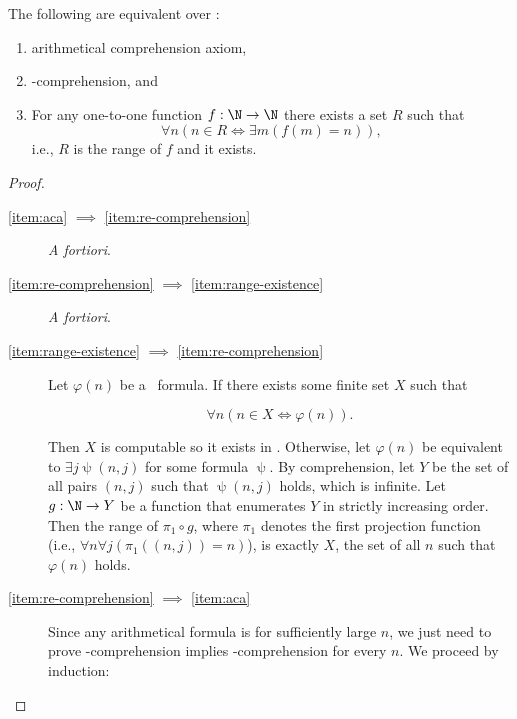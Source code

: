 \documentclass[../main.tex]{memoir}
\begin{document}
\begin{lemma}
  \label{lemma:aca-equivalences}
  The following are equivalent over \rca:

  \begin{enumerate}[label=(\roman*), ref=(\roman*)]
  \item \label{item:aca} arithmetical comprehension axiom,
  \item \label{item:re-comprehension} \re-comprehension, and
  \item \label{item:range-existence} For any one-to-one function $f: \N \to \N$ there exists a set $R$ such that
    \[ \forall n (n \in R \iff \exists m (f(m) = n)), \]
    i.e., $R$ is the range of $f$ and it exists.
  \end{enumerate}
\end{lemma}
\begin{proof}
  \begin{description}
  \item[\ref{item:aca} $\implies$ \ref{item:re-comprehension}] \textit{A fortiori}.
  \item[\ref{item:re-comprehension} $\implies$ \ref{item:range-existence}] \textit{A fortiori}.
  \item[\ref{item:range-existence} $\implies$ \ref{item:re-comprehension}]
    Let $\varphi(n)$ be a \re\ formula. If there exists some finite set $X$ such that

    \[ \forall n (n \in X \iff \varphi(n)). \]

    Then $X$ is computable so it exists in \rca. Otherwise, let $\varphi(n)$ be equivalent to $\exists j \uppsi(n, j)$ for some  formula $\uppsi$. By  comprehension, let $Y$ be the set of all pairs $(n, j)$ such that $\uppsi(n, j)$ holds, which is infinite. Let $g: \N \to Y$ be a function that enumerates $Y$ in strictly increasing order. Then the range of $\pi_1 \circ g$, where $\pi_1$ denotes the first projection function (i.e., $\forall n \forall j (\pi_1((n, j)) = n)$), is exactly $X$, the set of all $n$ such that $\varphi(n)$ holds.
  \item[\ref{item:re-comprehension} $\implies$ \ref{item:aca}] Since any arithmetical formula is  for sufficiently large $n$, we just need to prove \re-comprehension implies -comprehension for every $n$. We proceed by induction:


\end{description}
\end{proof}
\end{document}
